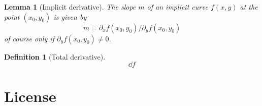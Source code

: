 \documentclass[twocolumn, margin=normal]{tex/hsrzf}
\theoremstyle{fuvarzf}
\newtheorem{definition}{Definition}
\newtheorem{lemma}{Lemma}
\begin{document}
\begin{lemma}[Implicit derivative]
  The slope \(m\) of an implicit curve \(f(x,y)\) at the point \((x_0, y_0)\) is given by
  \[
    m = \partial_x f(x_0, y_0) / \partial_y f(x_0, y_0)
  \]
  of course only if \(\partial_y f(x_0, y_0) \neq 0\).
\end{lemma}

\begin{definition}[Total derivative]
  \[
    \dd{f}
  \]
\end{definition}


\section*{License}
\doclicenseText

\begin{center}
  \doclicenseImage
\end{center}
\end{document}
